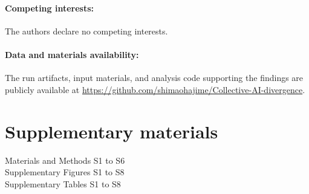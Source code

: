 \documentclass[12pt]{article}
\begin{document}
\paragraph*{Competing interests:}
The authors declare no competing interests.
\paragraph*{Data and materials availability:}
The run artifacts, input materials, and analysis code supporting the findings
are publicly available at
\url{https://github.com/shimaohajime/Collective-AI-divergence}.

\section*{Supplementary materials}
Materials and Methods S1 to S6\\
Supplementary Figures S1 to S8\\
Supplementary Tables S1 to S8
\end{document}
